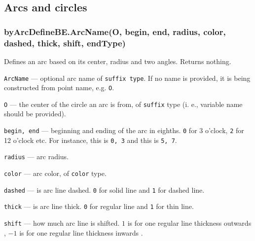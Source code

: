 \documentclass{ltxdoc}
\begin{document}

\subsection{Arcs and circles}


\subsubsection{byArcDefineBE.ArcName(O, begin, end, radius, color, dashed, thick, shift, endType)}\label{byArcDefineBE}

	Defines an arc based on its center, radius and two angles. Returns nothing.

	
	\texttt{ArcName} — optional arc name of \texttt{suffix type}. If no name is provided, it is being constructed from point name, e.g. \texttt{O}.
	
	\texttt{O} — the center of the circle an arc is from, of \texttt{suffix} type (i. e., variable name should be provided).
	
	\texttt{begin, end} — beginning and ending of the arc in eighths. \texttt{0} for 3 o'clock, \texttt{2} for 12 o'clock etc. For instance, this
	is \texttt{0, 3} and this
	is \texttt{5, 7}.
	
	\texttt{radius} — arc radius.
	
	\texttt{color} — arc color, of \texttt{color} type.
	
	\texttt{dashed} — is arc line dashed. \texttt{0} for solid line and \texttt{1} for dashed line.
	
	\texttt{thick} — is arc line thick. \texttt{0} for regular line and \texttt{1} for thin line.
	
	\texttt{shift} — how much arc line is shifted. \texttt{$1$} is for one regular line thickness outwards
	, \texttt{$-1$} is for one regular line thickness inwards
	.
	
\end{document}
